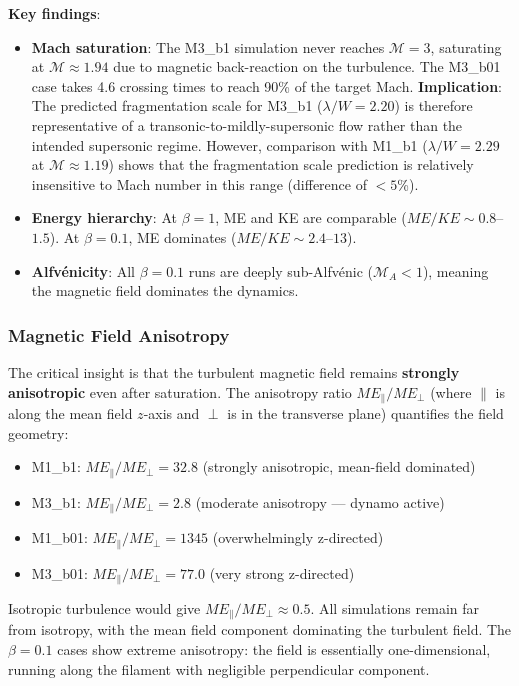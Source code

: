 \documentclass[11pt,a4paper]{article}
\begin{document}
\noindent\textbf{Key findings}:
\begin{itemize}
    \item \textbf{Mach saturation}: The M3\_b1 simulation never reaches $\mathcal{M} = 3$, saturating at $\mathcal{M} \approx 1.94$ due to magnetic back-reaction on the turbulence. The M3\_b01 case takes 4.6 crossing times to reach 90\% of the target Mach. \textbf{Implication}: The predicted fragmentation scale for M3\_b1 ($\lambda/W = 2.20$) is therefore representative of a transonic-to-mildly-supersonic flow rather than the intended supersonic regime. However, comparison with M1\_b1 ($\lambda/W = 2.29$ at $\mathcal{M} \approx 1.19$) shows that the fragmentation scale prediction is relatively insensitive to Mach number in this range (difference of $<5$\%).
    \item \textbf{Energy hierarchy}: At $\beta = 1$, ME and KE are comparable ($ME/KE \sim 0.8$--$1.5$). At $\beta = 0.1$, ME dominates ($ME/KE \sim 2.4$--$13$).
    \item \textbf{Alfv\'enicity}: All $\beta = 0.1$ runs are deeply sub-Alfv\'enic ($\mathcal{M}_A < 1$), meaning the magnetic field dominates the dynamics.
\end{itemize}

\subsubsection{Magnetic Field Anisotropy}

The critical insight is that the turbulent magnetic field remains \textbf{strongly anisotropic} even after saturation. The anisotropy ratio $ME_\parallel / ME_\perp$ (where $\parallel$ is along the mean field $z$-axis and $\perp$ is in the transverse plane) quantifies the field geometry:

\begin{itemize}
    \item M1\_b1: $ME_\parallel/ME_\perp = 32.8$ (strongly anisotropic, mean-field dominated)
    \item M3\_b1: $ME_\parallel/ME_\perp = 2.8$ (moderate anisotropy — dynamo active)
    \item M1\_b01: $ME_\parallel/ME_\perp = 1345$ (overwhelmingly z-directed)
    \item M3\_b01: $ME_\parallel/ME_\perp = 77.0$ (very strong z-directed)
\end{itemize}

Isotropic turbulence would give $ME_\parallel/ME_\perp \approx 0.5$. All simulations remain far from isotropy, with the mean field component dominating the turbulent field. The $\beta = 0.1$ cases show extreme anisotropy: the field is essentially one-dimensional, running along the filament with negligible perpendicular component.
\end{document}
